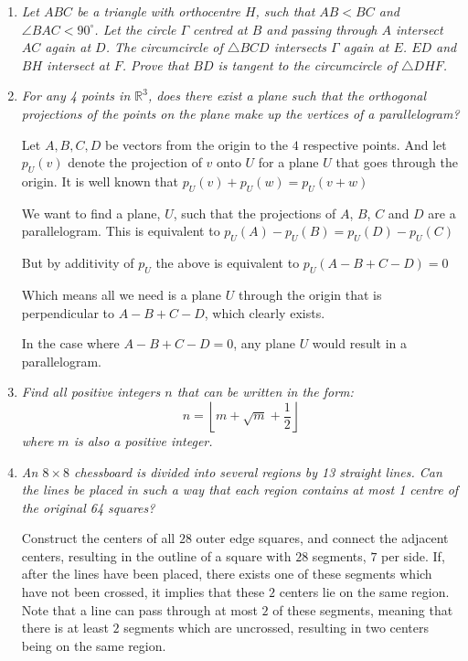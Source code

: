 \documentclass{article}
\begin{document}
\begin{enumerate}

\medskip
\item %
{\itshape Let $ABC$ be a triangle with orthocentre $H$, such that $AB<BC$ and $\angle BAC < 90^\circ$. Let the circle $\Gamma$ centred at $B$ and passing through $A$ intersect $AC$ again at $D$. The circumcircle of $\triangle BCD$ intersects $\Gamma$ again at $E$. $ED$ and $BH$ intersect at $F$. Prove that $BD$ is tangent to the circumcircle of $\triangle DHF$.
}


\medskip
\item %
{\itshape For any 4 points in $\mathbb{R}^3$, does there exist a plane such that the orthogonal projections of the points on the plane make up the vertices of a parallelogram?

}
Let $A,B,C,D$ be vectors from the origin to the $4$ respective points.
And let $p_U(v)$ denote the projection of $v$ onto $U$ for a plane $U$ that goes through the origin. It is well known that $p_U(v) + p_U(w) = p_U(v + w)$

We want to find a plane, $U$, such that the projections of $A$, $B$, $C$ and $D$ are a parallelogram. This is equivalent to
$p_U(A) - p_U(B) = p_U(D) - p_U(C)$

But by additivity of $p_U$ the above is equivalent to
$p_U(A - B + C - D) = 0$

Which means all we need is a plane $U$ through the origin that is perpendicular to $A - B + C - D$, which clearly exists.

In the case where $A - B + C - D = 0$, any plane $U$ would result in a parallelogram.

\medskip
\item %
{\itshape Find all positive integers $n$ that can be written in the form:
$$n = \left\lfloor m + \sqrt{m} + \frac{1}{2} \right\rfloor$$
where $m$ is also a positive integer.}



\medskip
\item %
{\itshape An $8 \times 8$ chessboard is divided into several regions by 13 straight lines. Can the lines be placed in such a way that each region contains at most 1 centre of the original 64 squares?}

Construct the centers of all $28$ outer edge squares, and connect the adjacent centers, resulting in the outline of a square with $28$ segments, $7$ per side. If, after the lines have been placed, there exists one of these segments which have not been crossed, it implies that these $2$ centers lie on the same region. 
Note that a line can pass through at most $2$ of these segments, meaning that there is at least $2$ segments which are uncrossed, resulting in two centers being on the same region.



\end{enumerate}
\end{document}
